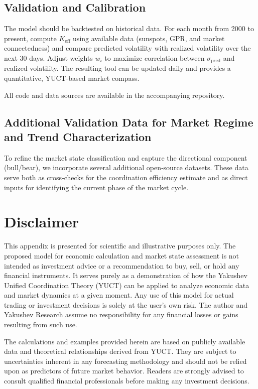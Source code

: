 \documentclass[11pt,a4paper]{article}
\theoremstyle{remark}
\begin{document}
	\subsection{Validation and Calibration}
	
	The model should be backtested on historical data. For each month from 2000 to present, compute \(K_{\mathrm{eff}}\) using available data (sunspots, GPR, and market connectedness) and compare predicted volatility with realized volatility over the next 30 days. Adjust weights \(w_i\) to maximize correlation between \(\sigma_{\text{pred}}\) and realized volatility. The resulting tool can be updated daily and provides a quantitative, YUCT‑based market compass.
	
	All code and data sources are available in the accompanying repository.
	
	\subsection{Additional Validation Data for Market Regime and Trend Characterization}
	\label{subsec:additional_data}
	
	To refine the market state classification and capture the directional component (bull/bear), we incorporate several additional open‑source datasets. These data serve both as cross‑checks for the coordination efficiency estimate and as direct inputs for identifying the current phase of the market cycle.
	
	\section*{Disclaimer}
	\label{sec:disclaimer}
	
	This appendix is presented for scientific and illustrative purposes only. The proposed model for economic calculation and market state assessment is not intended as investment advice or a recommendation to buy, sell, or hold any financial instruments. It serves purely as a demonstration of how the Yakushev Unified Coordination Theory (YUCT) can be applied to analyze economic data and market dynamics at a given moment. Any use of this model for actual trading or investment decisions is solely at the user's own risk. The author and Yakushev Research assume no responsibility for any financial losses or gains resulting from such use.
	
	The calculations and examples provided herein are based on publicly available data and theoretical relationships derived from YUCT. They are subject to uncertainties inherent in any forecasting methodology and should not be relied upon as predictors of future market behavior. Readers are strongly advised to consult qualified financial professionals before making any investment decisions.
	
\end{document}
